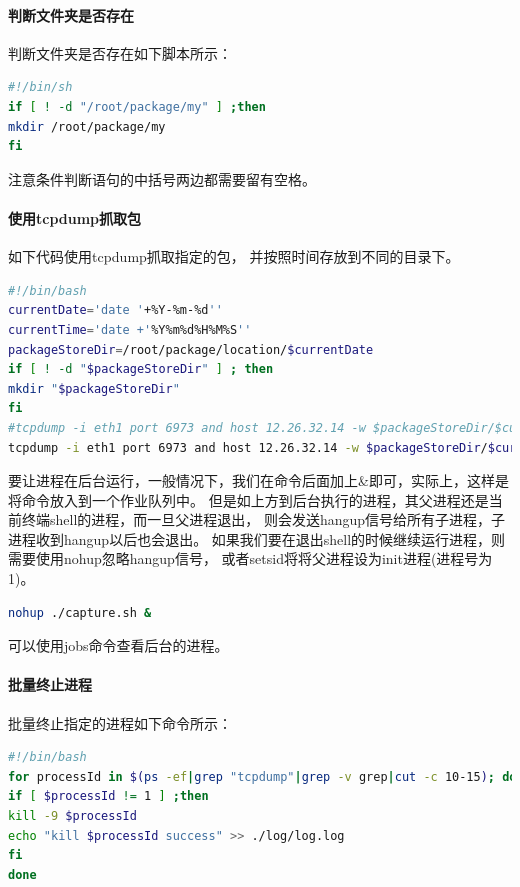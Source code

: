 \documentclass{book}
\begin{document}
\paragraph{判断文件夹是否存在}判断文件夹是否存在如下脚本所示：

\begin{lstlisting}[language=Bash]
#!/bin/sh
if [ ! -d "/root/package/my" ] ;then
mkdir /root/package/my
fi
\end{lstlisting}

注意条件判断语句的中括号两边都需要留有空格。

\paragraph{使用tcpdump抓取包}如下代码使用tcpdump抓取指定的包，
并按照时间存放到不同的目录下。

\begin{lstlisting}[language=Bash]
#!/bin/bash
currentDate='date '+%Y-%m-%d''
currentTime='date +'%Y%m%d%H%M%S''
packageStoreDir=/root/package/location/$currentDate
if [ ! -d "$packageStoreDir" ] ; then
mkdir "$packageStoreDir"
fi
#tcpdump -i eth1 port 6973 and host 12.26.32.14 -w $packageStoreDir/$currentTime.cap
tcpdump -i eth1 port 6973 and host 12.26.32.14 -w $packageStoreDir/$currentTime.cap
\end{lstlisting}

要让进程在后台运行，一般情况下，我们在命令后面加上\&即可，实际上，这样是将命令放入到一个作业队列中。
但是如上方到后台执行的进程，其父进程还是当前终端shell的进程，而一旦父进程退出，
则会发送hangup信号给所有子进程，子进程收到hangup以后也会退出。
如果我们要在退出shell的时候继续运行进程，则需要使用nohup忽略hangup信号，
或者setsid将将父进程设为init进程(进程号为1)。

\begin{lstlisting}[language=Bash]
nohup ./capture.sh &
\end{lstlisting}

可以使用jobs命令查看后台的进程。

\paragraph{批量终止进程}批量终止指定的进程如下命令所示：

\begin{lstlisting}[language=Bash]
#!/bin/bash
for processId in $(ps -ef|grep "tcpdump"|grep -v grep|cut -c 10-15); do	
if [ $processId != 1 ] ;then
kill -9 $processId
echo "kill $processId success" >> ./log/log.log
fi
done
\end{lstlisting}
\end{document}
